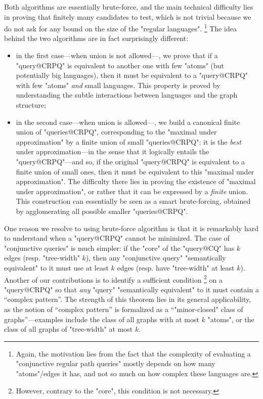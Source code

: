 Both algorithms are essentially brute-force, and the main technical difficulty
lies in proving that finitely many candidates to test, which is not
trivial because we do not ask for any bound on the size of the "regular languages".%
\footnote{Again, the motivation lies from the fact that the complexity of evaluating
a "conjunctive regular path queries" mostly depends on how many "atoms"/edges it has,
and not so much on how complex these languages are.}
The idea behind the two algorithms are in fact surprisingly different:
\begin{itemize}
	\item in the first case---when union is not allowed---, we prove that
		if a "query@CRPQ" is equivalent to another one with few
		"atoms" (but potentially big languages), then it must be
		equivalent to a "query@CRPQ" with few "atoms" \emph{and} small languages.
		This property is proved by understanding the subtle interactions between
		languages and the graph structure;
	\item in the second case---when union is allowed---, we build a canonical
		finite union of "queries@CRPQ", corresponding to the
		"maximal under approximation" by a finite union of small "queries@CRPQ": 
		it is the \emph{best} under approximation---in the sense that
		it logically entails the "query@CRPQ"---and so, if the original
		"query@CRPQ" is equivalent to a finite union of small ones, then
		it must be equivalent to this "maximal under approximation".
		The difficulty there lies in proving the existence of "maximal under approximation",
		or rather that it can be expressed by a \emph{finite} union.
		This construction can essentially be seen as a
		smart brute-forcing, obtained by agglomerating all possible smaller "queries@CRPQ".
\end{itemize}

One reason we resolve to using brute-force algorithm is that it is
remarkably hard to understand when a "query@CRPQ" cannot be minimized.
The case of "conjunctive queries" is much simpler: if the "core" 
of the "query@CQ" has $k$ edges (resp. "tree-width" $k$),
then any "conjunctive query" "semantically equivalent" to it must use at least $k$ edges
(resp. have "tree-width" at least $k$).
Another of our contributions is to identify a sufficient condition%
\footnote{However, contrary to the "core", this condition is not necessary.}
on a "query@CRPQ" so that \emph{any} "query" "semantically equivalent" to it
must contain a ``complex pattern''. The strength of this theorem lies in its
general applicability, as the notion of ``complex pattern''
is formalized as a ``"minor-closed" class
of graphs''---examples include the class of all graphs with at most $k$ "atoms",
or the class of all graphs of "tree-width" at most $k$.

